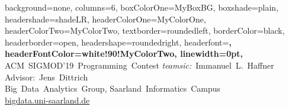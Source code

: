 \documentclass[a1paper,portrait,american,fontscale=.4]{baposter}
\begin{document}
\begin{poster}{
        background=none,
        columns=6,
        boxColorOne=MyBoxBG,
        boxshade=plain,
        headershade=shadeLR,
        headerColorOne=MyColorOne,
        headerColorTwo=MyColorTwo,
        textborder=roundedleft,
        borderColor=black,
        headerborder=open,
        headershape=roundedright,
        headerfont=\large\bfseries,
        headerFontColor=white!90!MyColorTwo,
        linewidth=0pt,
    }
    {}
    {
        \LARGE ACM~SIGMOD'19~Programming~Contest
    }
    {
        \vspace*{.5em}
        \emph{teamsic:}~Immanuel~L.~Haffner
        \qquad
        Advisor:~Jens~Dittrich
        \\[.5em]
        \small
        Big~Data~Analytics~Group, Saarland~Informatics~Campus
        \\[.5em]
        \url{bigdata.uni-saarland.de}
    }
    {
    }


\end{poster}
\end{document}
